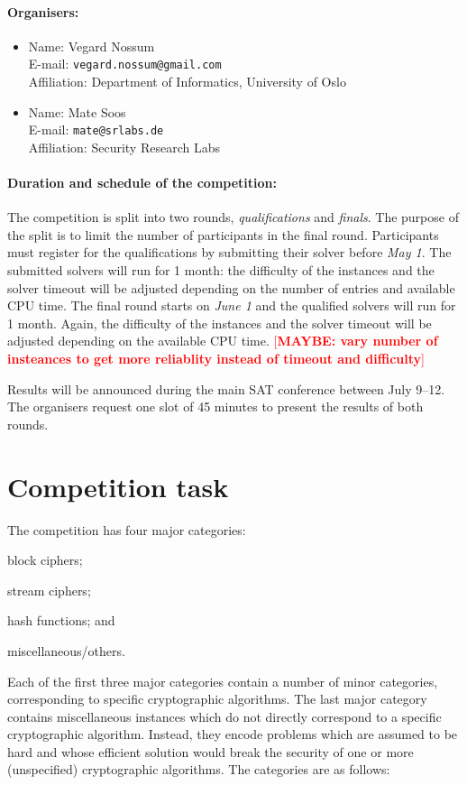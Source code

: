 \documentclass[12pt, a4paper]{article}
\newcommand{\XXX}[1]{\textcolor{red}{[\textbf{#1}]}}
\begin{document}
\paragraph{Organisers:}
\begin{itemize}
\item Name: Vegard Nossum \\ E-mail: \texttt{vegard.nossum@gmail.com} \\ Affiliation: Department of Informatics, University of Oslo
\item Name: Mate Soos \\ E-mail: \texttt{mate@srlabs.de} \\ Affiliation: Security Research Labs
\end{itemize}

\paragraph{Duration and schedule of the competition:} The competition is split into two rounds, \emph{qualifications} and \emph{finals}. The purpose of the split is to limit the number of participants in the final round. Participants must register for the qualifications by submitting their solver before \emph{May 1}. The submitted solvers will run for 1 month: the difficulty of the instances and the solver timeout will be adjusted depending on the number of entries and available CPU time. The final round starts on \emph{June 1} and the qualified solvers will run for 1 month. Again, the difficulty of the instances and the solver timeout will be adjusted depending on the available CPU time.
\XXX{MAYBE: vary number of insteances to get more reliablity instead of timeout and difficulty}

Results will be announced during the main SAT conference between July 9--12. The organisers request one slot of 45 minutes to present the results of both rounds.

\section{Competition task}

The competition has four major categories:
\begin{inparaenum}[(1)]
\item block ciphers;
\item stream ciphers;
\item hash functions; and
\item miscellaneous/others.
\end{inparaenum}
Each of the first three major categories contain a number of minor categories, corresponding to specific cryptographic algorithms. The last major category contains miscellaneous instances which do not directly correspond to a specific cryptographic algorithm. Instead, they encode problems which are assumed to be hard and whose efficient solution would break the security of one or more (unspecified) cryptographic algorithms. The categories are as follows:
\end{document}
